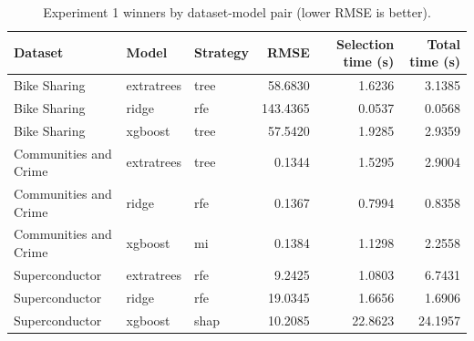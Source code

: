 \begin{table}
\caption{Experiment 1 winners by dataset-model pair (lower RMSE is better).}
\label{tab:exp1_winners}
\begin{tabular}{lllrrr}
\toprule
Dataset & Model & Strategy & RMSE & Selection time (s) & Total time (s) \\
\midrule
Bike Sharing & extratrees & tree & 58.6830 & 1.6236 & 3.1385 \\
Bike Sharing & ridge & rfe & 143.4365 & 0.0537 & 0.0568 \\
Bike Sharing & xgboost & tree & 57.5420 & 1.9285 & 2.9359 \\
Communities and Crime & extratrees & tree & 0.1344 & 1.5295 & 2.9004 \\
Communities and Crime & ridge & rfe & 0.1367 & 0.7994 & 0.8358 \\
Communities and Crime & xgboost & mi & 0.1384 & 1.1298 & 2.2558 \\
Superconductor & extratrees & rfe & 9.2425 & 1.0803 & 6.7431 \\
Superconductor & ridge & rfe & 19.0345 & 1.6656 & 1.6906 \\
Superconductor & xgboost & shap & 10.2085 & 22.8623 & 24.1957 \\
\bottomrule
\end{tabular}
\end{table}
